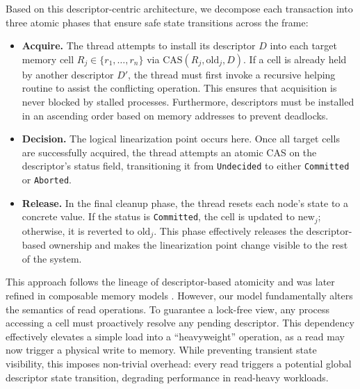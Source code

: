 Based on this descriptor-centric architecture, we decompose each transaction into three atomic phases that ensure safe state transitions across the frame:

\begin{itemize}
    \item \textbf{Acquire.} The thread attempts to install its descriptor $D$ into each target memory cell $R_j \in \{r_1, \dots, r_n\}$ via $\text{CAS}(R_j, \text{old}_j, D)$. If a cell is already held by another descriptor $D'$, the thread must first invoke a recursive helping routine to assist the conflicting operation. This ensures that acquisition is never blocked by stalled processes. Furthermore, descriptors must be installed in an ascending order based on memory addresses to prevent deadlocks.

    \item \textbf{Decision.} The logical linearization point occurs here. Once all target cells are successfully acquired, the thread attempts an atomic CAS on the descriptor's status field, transitioning it from \texttt{Undecided} to either \texttt{Committed} or \texttt{Aborted}.

    \item \textbf{Release.} In the final cleanup phase, the thread resets each node's state to a concrete value. If the status is \texttt{Committed}, the cell is updated to $\text{new}_j$; otherwise, it is reverted to $\text{old}_j$. This phase effectively releases the descriptor-based ownership and makes the linearization point change visible to the rest of the system.
\end{itemize}

This approach follows the lineage of descriptor-based atomicity and was later refined in composable memory models \cite{ComposableMT}. However, our model fundamentally alters the semantics of read operations. To guarantee a lock-free view, any process accessing a cell must proactively resolve any pending descriptor. This dependency effectively elevates a simple load into a ``heavyweight'' operation, as a read may now trigger a physical write to memory. While preventing transient state visibility, this imposes non-trivial overhead: every read triggers a potential global descriptor state transition, degrading performance in read-heavy workloads.
